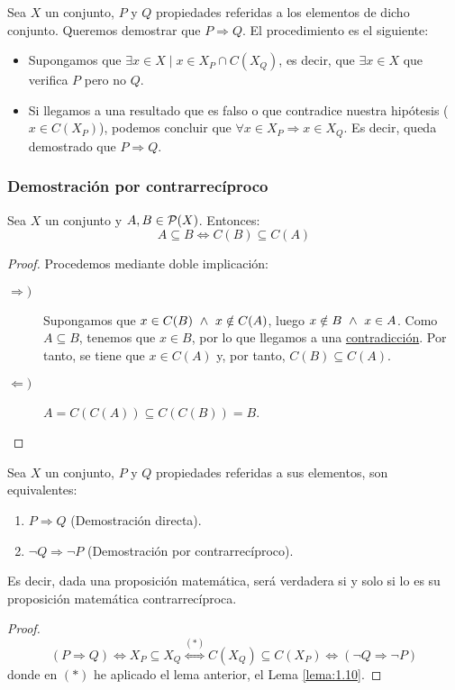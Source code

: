 Sea $X$ un conjunto, $P$ y $Q$ propiedades referidas a los elementos de dicho conjunto. Queremos demostrar que $P \Rightarrow Q$. El procedimiento es el siguiente:

\begin{itemize}
    \item Supongamos que $\exists x \in X \mid x \in X_P\cap C(X_Q)$, es decir, que $\exists x\in X$ que verifica $P$ pero no $Q$.
    
    \item Si llegamos a una resultado que es falso o que contradice nuestra hipótesis ($x\in C(X_P)$), podemos concluir que $\forall x \in X_P \Longrightarrow x \in X_Q$. Es decir, queda demostrado que $P \Longrightarrow Q$.
\end{itemize}

\subsubsection{Demostración por contrarrecíproco}

\begin{lema}\label{lema:1.10}
    Sea $X$ un conjunto y $A, B \in \mathcal{P}(X)$. Entonces:
    $$A \subseteq B \Longleftrightarrow C(B) \subseteq C(A)$$
\end{lema}
\begin{proof} Procedemos mediante doble implicación:
\begin{description}
    \item [$\Longrightarrow)$] Supongamos que $x \in C(B) \ \land \  x \notin C(A)$, luego $x \notin B \ \land \  x \in A$. Como $A\subseteq B$, tenemos que $x\in B$, por lo que llegamos a una \underline{contradicción}. Por tanto, se tiene que $x\in C(A)$ y, por tanto, $C(B)\subseteq C(A)$.

    \item [$\Longleftarrow)$] $A = C(C(A)) \subseteq C(C(B)) = B$.
\end{description}
\end{proof}

\begin{prop}
    Sea $X$ un conjunto, $P$ y $Q$ propiedades referidas a sus elementos, son equivalentes:
    \begin{enumerate}
        \item $P \Rightarrow Q$ (Demostración directa).
        \item $\neg Q \Rightarrow \neg P$ (Demostración por contrarrecíproco).
    \end{enumerate}
    Es decir, dada una proposición matemática, será verdadera si y solo si lo es su proposición matemática contrarrecíproca.
\end{prop}
\begin{proof}
\begin{equation*}
    (P \Rightarrow Q) \Leftrightarrow X_P \subseteq X_Q
    \stackrel{(\ast)}{\Longleftrightarrow}
    C(X_Q) \subseteq C(X_P) \Longleftrightarrow (\neg Q \Rightarrow \neg P)
\end{equation*}
donde en $(\ast)$ he aplicado el lema anterior, el Lema \ref{lema:1.10}.
\end{proof}

